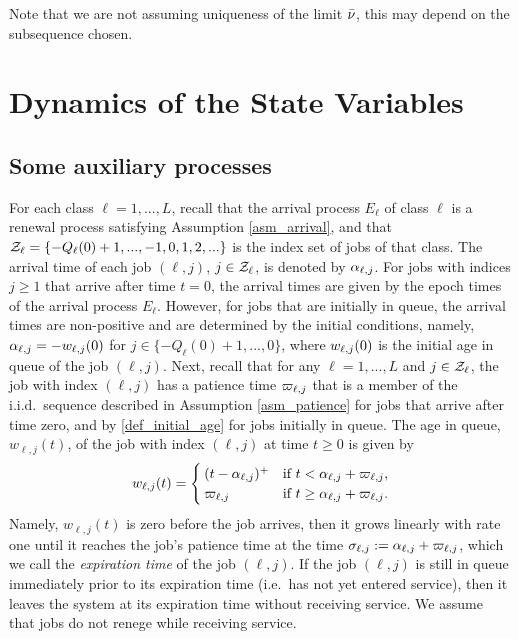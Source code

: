 \documentclass{article}
\numberwithin{equation}{section}
\begin{document}
\begin{remark}
Note that we are not assuming uniqueness of the limit $\bar{\nu}$, this may depend on the  subsequence chosen.
\end{remark}




\section{Dynamics of the State Variables}



\subsection{Some auxiliary processes}
For each class $\ell=1,...,L$, recall that the arrival process $E_\ell$ of class $\ell$ is a renewal process satisfying Assumption \ref{asm_arrival}, and that $\mathcal{Z}_\ell=\{-Q_\ell(0)+1,...,-1,0,1,2,...\}$ is the index set of jobs of that class. The arrival time of each job $(\ell,j)$, $j\in \mathcal{Z}_\ell$, is denoted by $\alpha_{\ell,j}$. For jobs with indices $j\geq1$ that arrive after time $t=0$, the arrival times are given by the epoch times of the arrival process $E_\ell$. However, for jobs  that are initially in queue, the arrival times are non-positive and are determined by the initial conditions, namely,  $\alpha_{\ell,j}=-w_{\ell,j}(0)$ for $j\in\{-Q_\ell(0)+1,...,0\}$, where $w_{\ell,j}(0)$ is the initial age in queue of the job $(\ell,j)$. Next, recall that for any $\ell=1,...,L$ and $j\in\mathcal{Z}_\ell$, the job with index $(\ell,j)$ has a patience time $\varpi_{\ell,j}$ that is a member of the i.i.d.\ sequence described in Assumption \ref{asm_patience} for jobs that arrive after time zero, and by \eqref{def_initial_age} for jobs initially in queue. The age in queue, $w_{\ell,j}(t)$, of the job with index $(\ell,j)$ at time $t\geq0$ is given by
\begin{equation}\label{def_w}
w_{\ell,j}(t)=
  \begin{cases} (t-\alpha_{\ell,j})^+ & \text{if }  t<\alpha_{\ell,j}+\varpi_{\ell,j},\\
  \varpi_{\ell,j}& \text{if }t\geq \alpha_{\ell,j}+\varpi_{\ell,j}.
  \end{cases}
\end{equation}
Namely, $w_{\ell,j}(t)$ is zero before the job arrives, then it grows linearly with rate one until it reaches the job's patience time at the time $\sigma_{\ell,j}:=\alpha_{\ell,j}+\varpi_{\ell,j}$, which we call the \textit{expiration time} of the job $(\ell,j)$. If the job $(\ell,j)$ is still in queue immediately prior to its expiration time (i.e.\ has not yet entered service), then it leaves the system at its expiration time without receiving service. We assume that jobs do not renege while receiving service. 
\end{document}
